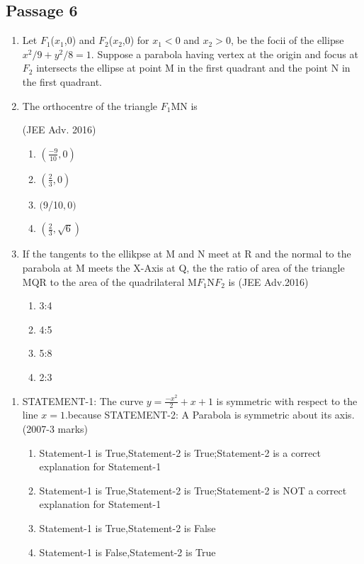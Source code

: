 \documentclass[journal,12pt,twocolumn]{IEEEtran}
\theoremstyle{remark}
\begin{document}
\subsection{Passage 6}
\begin{enumerate}
\item[] Let ${F_1}$($x_1$,0) and  ${F_2}$($x_2$,0) for $x_1<0$ and $x_2>0$, be the focii of the ellipse $x^2/9 +y^2/8 =1$. Suppose a parabola having vertex at the origin and focus at $F_2$ intersects the ellipse at point M in the first quadrant and the point N in the first quadrant.
\item The orthocentre of the triangle $F_1$MN is

         \hfill(JEE Adv. 2016)
\begin{enumerate}
     \item $(\frac{-9}{10},0)$   
     \item $(\frac{2}{3},0)$     
     \item $($9/10$,0)$ 
    \item $(\frac{2}{3},\sqrt{6})$ 
    \end{enumerate}
\item If the tangents to the ellikpse at M and N meet at R and the normal to the parabola at M meets the X-Axis at Q, the the ratio of area of the triangle MQR to the area of the quadrilateral M$F_1$N$F_2$ is
\hfill(JEE Adv.2016)
\begin{enumerate}
    \item 3:4
    \item 4:5
    \item 5:8
    \item 2:3
\end{enumerate}
\end{enumerate}
\begin{enumerate}
\item STATEMENT-1: The curve $y=\frac{-x^2}{2}+x+1$ is symmetric with respect to the line $x=1$.because
STATEMENT-2: A Parabola is symmetric about its axis.
\hfill(2007-3 marks)
\begin{enumerate}
    \item Statement-1 is True,Statement-2 is True;Statement-2 is a correct explanation for Statement-1\item  Statement-1 is True,Statement-2 is True;Statement-2 is NOT a correct explanation for Statement-1\item Statement-1 is True,Statement-2 is False\item Statement-1 is False,Statement-2 is True
\end{enumerate}
\end{enumerate}
\end{document}
